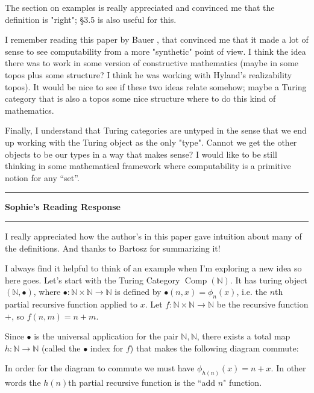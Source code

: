 \documentclass{amsart}
\newcommand{\iam}[1]{
  \vspace{0.25em}
  \hrule
  \vspace{0.25em}
  \textbf{{#1}'s Reading Response}
  \vspace{0.25em}
  \hrule
  \vspace{1em}
}
\begin{document}
The section on examples is really appreciated and convinced me that
the definition is "right"; \S 3.5 is also useful for this.

I remember reading this paper by Bauer \cite{BauerComputability}, that
convinced me that it made a lot of sense to see computability from a
more "synthetic" point of view.  I think the idea there was to work in
some version of constructive mathematics (maybe in some topos plus
some structure? I think he was working with Hyland's realizability
topos).  It would be nice to see if these two ideas relate somehow;
maybe a Turing category that is also a topos some nice structure where
to do this kind of mathematics.

Finally, I understand that Turing categories are untyped in the sense
that we end up working with the Turing object as the only "type".
Cannot we get the other objects to be our types in a way that makes
sense? I would like to be still thinking in some mathematical framework
where computability is a primitive notion for any ``set''.



\iam{Sophie}



I really appreciated how the author's in this paper gave intuition about many of the definitions. And thanks to Bartosz for summarizing it!

I always find it helpful to think of an example when I'm exploring a new idea so here goes. Let's start with the Turing Category $\operatorname{Comp}(\mathbb N)$. It has turing object $(\mathbb N, \bullet)$, where $\bullet: \mathbb N\times \mathbb N \to \mathbb N$ is defined by $\bullet(n,x) = \phi_n(x)$, i.e. the $n$th partial recursive function applied to $x$.  Let $f: \mathbb N \times \mathbb N \to \mathbb N$ be the recursive function $+$, so $f(n,m) = n + m$.

Since $\bullet$ is the universal application for the pair $\mathbb N, \mathbb N$, there exists a total map $h: \mathbb N \to \mathbb N$ (called the $\bullet$ index for $f$) that makes the following diagram commute:
\begin{center}
\end{center}

In order for the diagram to commute we must have $\phi_{h(n)}(x) = n + x$. In other words the $h(n)$th partial recursive function is the ``add $n$" function.
\end{document}
